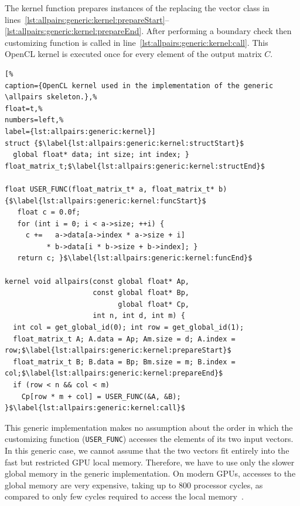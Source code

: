 The  kernel function prepares instances of the  replacing the vector class in lines~\ref{lst:allpairs:generic:kernel:prepareStart}--\ref{lst:allpairs:generic:kernel:prepareEnd}.
After performing a boundary check then customizing function is called in line~\ref{lst:allpairs:generic:kernel:call}.
This OpenCL kernel is executed once for every element of the output matrix $C$.

\begin{lstlisting}[%                                                             
caption={OpenCL kernel used in the implementation of the generic \allpairs skeleton.},%
float=t,%                                                                       
numbers=left,%
label={lst:allpairs:generic:kernel}]
struct {$\label{lst:allpairs:generic:kernel:structStart}$
  global float* data; int size; int index; } float_matrix_t;$\label{lst:allpairs:generic:kernel:structEnd}$

float USER_FUNC(float_matrix_t* a, float_matrix_t* b) {$\label{lst:allpairs:generic:kernel:funcStart}$
   float c = 0.0f;
   for (int i = 0; i < a->size; ++i) {
     c +=   a->data[a->index * a->size + i]
          * b->data[i * b->size + b->index]; }
   return c; }$\label{lst:allpairs:generic:kernel:funcEnd}$

kernel void allpairs(const global float* Ap,
                     const global float* Bp,
                           global float* Cp,
                     int n, int d, int m) {
  int col = get_global_id(0); int row = get_global_id(1);
  float_matrix_t A; A.data = Ap; Am.size = d; A.index = row;$\label{lst:allpairs:generic:kernel:prepareStart}$
  float_matrix_t B; B.data = Bp; Bm.size = m; B.index = col;$\label{lst:allpairs:generic:kernel:prepareEnd}$
  if (row < n && col < m)
    Cp[row * m + col] = USER_FUNC(&A, &B); }$\label{lst:allpairs:generic:kernel:call}$
\end{lstlisting}

This generic implementation makes no assumption about the order in which the customizing function (\texttt{USER\_FUNC}) accesses the elements of its two input vectors.
In this generic case, we cannot assume that the two vectors fit entirely into the fast but restricted GPU local memory.
Therefore, we have to use only the slower global memory in the generic implementation.
On modern GPUs, accesses to the global memory are very expensive, taking up to 800 processor cycles, as compared to only few cycles required to access the local memory~\cite{CUDAProgrammingGuide}.

